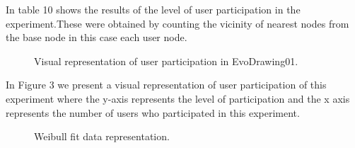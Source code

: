 In table 10 shows the results of the level of user participation in the
experiment.These were obtained by counting the vicinity of nearest nodes from
the base node in this case each user node.

\begin{figure}
\centering
{} %
\caption{Visual representation of user participation in EvoDrawing01.}
\label{fig:userP_2}   
\end{figure}


In Figure 3 we present a visual representation of user participation of this
experiment where the y-axis represents the level of participation and the x axis
represents the number of users who participated in this experiment.

\begin{figure}
\centering
{} %
\caption{Weibull fit data representation.}
\label{fig:weibull_2}   
\end{figure}




